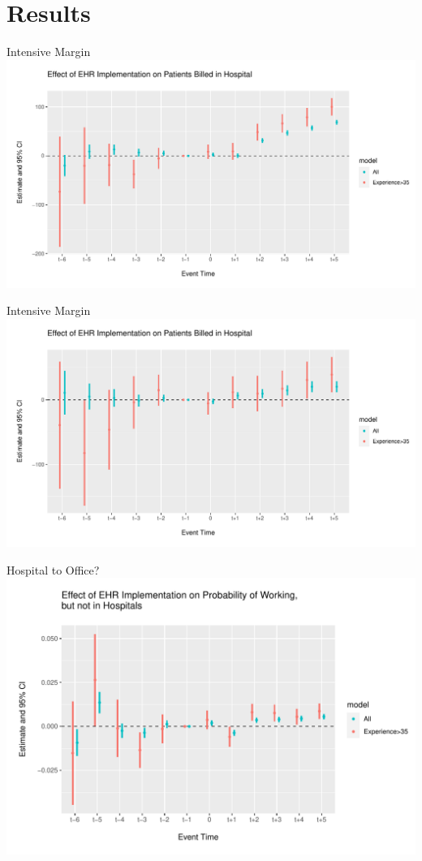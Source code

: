 \documentclass[10pt]{beamer}
\begin{document}
\section{Results}

\begin{frame}{Intensive Margin}
\centering
\includegraphics[scale=.45]{Objects/event_plot.pdf}
\end{frame}

\begin{frame}{Intensive Margin}
\centering
\includegraphics[scale=.45]{Objects/event_hosp_plot.pdf}
\end{frame}

\begin{frame}{Hospital to Office?}
    \centering
    \includegraphics[scale=.5]{Objects/event_plot_office_to_hosp.pdf}
\end{frame}
\end{document}
